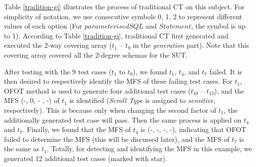 \documentclass[10pt,journal,compsoc]{IEEEtran}
\begin{document}
Table \ref{tradition-gi} illustrates the process of traditional CT on this subject. For simplicity of notation, we use consecutive symbols 0, 1, 2 to represent different values of each option (For $parameterised SQL$ and $Statement$, the symbol is up to 1). According to Table \ref{tradition-gi}, traditional CT first generated and executed the 2-way covering array ($t_{1}$ -- $t_{9}$ in the \emph{generation} part). Note that this covering array covered all the 2-degree schemas for the SUT.

After testing with the 9 test cases ($t_{1}$ to $t_{9}$),  we found $t_{1}$, $t_{4}$, and $t_{7}$ failed. It is then desired to respectively identify the MFS of these failing test cases. For $t_{1}$, OFOT method is used to generate four additional test cases ($t_{10}$ -- $t_{13}$), and the MFS (-, 0, - , -) of $t_{1}$ is identified (\emph{Scroll Type} is assigned to \emph{sensitive}, respectively). This is because only when changing the second factor of $t_{1}$, the additionally generated test case will pass. Then the same process is applied on $t_{4}$ and $t_{7}$. Finally, we found that the MFS of $t_{4}$ is (-, -, -, -), indicating that OFOT failed to determine the MFS (this will be discussed later), and the MFS of $t_{7}$ is the same as $t_{1}$. Totally, for detecting and identifying the MFS in this example, we generated 12 additional test cases (marked with star).
\end{document}
